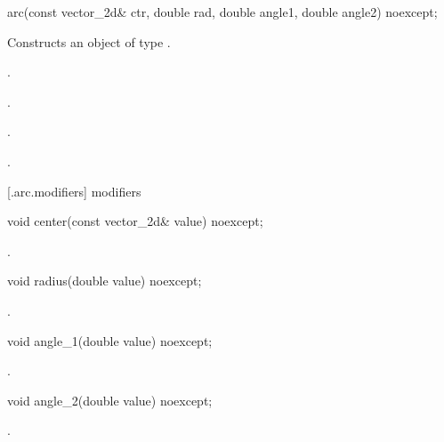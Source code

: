 \begin{itemdecl}
    arc(const vector_2d& ctr, double rad, double angle1, double angle2) noexcept;
\end{itemdecl}
\begin{itemdescr}
	\pnum
	\effects
	Constructs an object of type .
	
	\pnum
	\postconditions
	.

	.

	.

	.

\end{itemdescr}

 [\iotwod.arc.modifiers]{ modifiers}

\begin{itemdecl}
    void center(const vector_2d& value) noexcept;
\end{itemdecl}
\begin{itemdescr}
	\pnum
	\postconditions
	.
	
\end{itemdescr}

\begin{itemdecl}
    void radius(double value) noexcept;
\end{itemdecl}
\begin{itemdescr}
	\pnum
	\postconditions
	.
	
\end{itemdescr}

\begin{itemdecl}
    void angle_1(double value) noexcept;
\end{itemdecl}
\begin{itemdescr}
	\pnum
	\postconditions
	.
	
\end{itemdescr}

\begin{itemdecl}
    void angle_2(double value) noexcept;
\end{itemdecl}
\begin{itemdescr}
	\pnum
	\postconditions
	.
	
\end{itemdescr}

